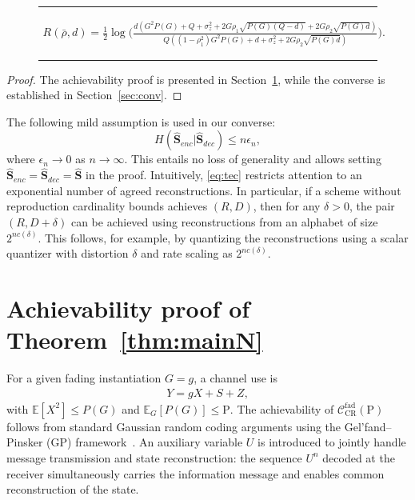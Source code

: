 \documentclass[journal]{IEEEtran}
\def\sCapa{\mathcal C_{\text{est}}^{\text{fad}}(\mathrm{P})}
\def\bhS{\hat{\mathbf S}}
\def\bhS{\hat{\mathbf S}}
\def\sCapa{\mathcal C_{\text{CR}}^{\text{fad}}(\mathrm{P})}
\begin{document}
\begin{figure}
\hrule
\begin{gather}
R(\bar{\rho},d) = \frac{1}{2}\log\Bigg(\frac{d(G^2 P(G)+Q+\sigma_z^2+ 2 G\rho_1\sqrt{P(G)(Q-d)}+2G \rho_2\sqrt{P(G) d})}{Q((1-\rho_1^2) G^2 P(G)
+d+\sigma_z^2+2G\rho_2\sqrt{P(G)d})
}\Bigg). \label{eq:ra}
\end{gather}
\hrule
\end{figure}
\begin{proof}
The achievability proof is presented in Section~\ref{sec:achieve}, while the converse is established in Section~\ref{sec:conv}.
\end{proof}
%


The following mild assumption is used in our converse:
\begin{equation}
H(\bhS_{enc}|\bhS_{dec}) \leq n \epsilon_n, \tag{T1} \label{eq:tec}
\end{equation}
where $\epsilon_n \to 0$ as $n \to \infty$. This entails no loss of generality and allows setting $\bhS_{enc} = \bhS_{dec} = \bhS$ in the proof. Intuitively, \eqref{eq:tec} restricts attention to an exponential number of agreed reconstructions. In particular, if a scheme without reproduction cardinality bounds achieves $(R,D)$, then for any $\delta > 0$, the pair $(R,D+\delta)$ can be achieved using reconstructions from an alphabet of size $2^{nc(\delta)}$. This follows, for example, by quantizing the reconstructions using a scalar quantizer with distortion $\delta$ and rate scaling as $2^{nc(\delta)}$.


\section{Achievability proof of Theorem~\ref{thm:mainN}} \label{sec:achieve}
For a given fading instantiation $G = g$, a channel use is
\begin{align}
Y = g X + S + Z, \label{eq:modelsplit}
\end{align}
with $\mathbb{E}[X^2] \leq P(G)$ and $\mathbb{E}_{G}[P(G)] \leq \mathrm{P}$.
The achievability of $\sCapa$ follows from standard Gaussian random coding arguments using the Gel’fand–Pinsker (GP) framework~\cite{gel1980coding}. An auxiliary variable $U$ is introduced to jointly handle message transmission and state reconstruction: the sequence $U^n$ decoded at the receiver simultaneously carries the information message and enables common reconstruction of the state.
\end{document}
